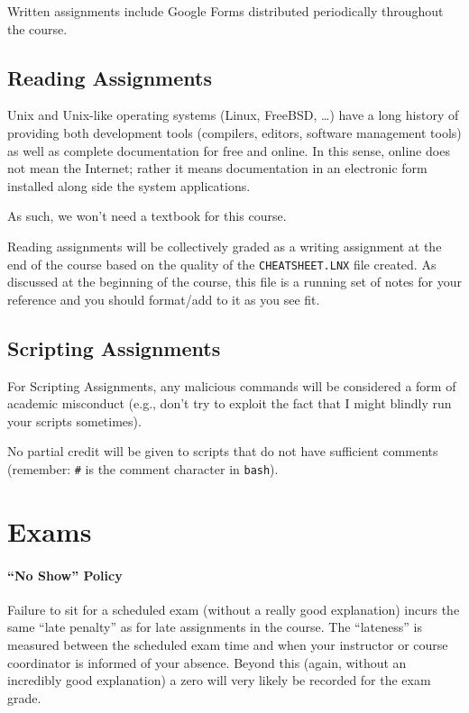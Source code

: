 \documentclass[12pt]{article}
\begin{document}
Written assignments include Google Forms distributed periodically throughout the course.

\subsection{Reading Assignments}
Unix and Unix-like operating systems (Linux, FreeBSD, \dots) have a long history of providing both development tools (compilers, editors, software
management tools) as well as complete documentation for free and online. In this sense, online does not mean the Internet; rather it means
documentation in an electronic form installed along side the system applications.

As such, we won't need a textbook for this course.

Reading assignments will be collectively graded as a writing assignment at the end of the course based on the quality of the \texttt{CHEATSHEET.LNX} file created. As
discussed at the beginning of the course, this file is a running set of notes for your reference and you should format/add to it as you see fit.

\subsection{Scripting Assignments}
For Scripting Assignments, any malicious commands will be considered a form of academic misconduct (e.g., don't try to exploit the fact that I might
blindly run your scripts sometimes).

No partial credit will be given to scripts that do not have sufficient comments (remember: \texttt{\#} is the comment character in \texttt{bash}).
\section{Exams}
\paragraph{``No Show'' Policy}
Failure to sit for a scheduled exam (without a really good explanation) incurs the same ``late penalty'' as for late assignments in the course. The
``lateness'' is measured between the scheduled exam time and when your instructor or course coordinator is informed of your absence.
Beyond this (again, without an incredibly good explanation) a zero will very likely be recorded for the exam grade.
\end{document}
